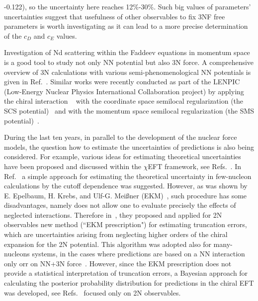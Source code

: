 -0.122), so the uncertainty here reaches 12\%-30\%. Such big values of parameters' uncertainties suggest that usefulness of other observables to fix 3NF free parameters is worth investigating as it can lead to a more precise determination of the $c_{D}$ and $c_{E}$ values. 

Investigation of Nd scattering within the Faddeev equations in momentum space is a good tool to study not only NN potential but also 3N force. A comprehensive overview of 3N calculations with various semi-phenomenological NN potentials is given in Ref.~\cite{Witaa2001}. Similar works were recently conducted as part of the LENPIC (Low-Energy Nuclear Physics International Collaboration project) by applying the chiral interaction ~\cite{binder2016few, binder2018few, epelbaum2019few} with the coordinate space semilocal regularization (the SCS potential)~\cite{Epelbaum2015} and with the momentum space semilocal regularization (the SMS potential)~\cite{Reinert2018, epelbaum2020towards}. 

During the last ten years, in parallel to the development of the nuclear force models, the question how to estimate the uncertainties of predictions is also being considered. For example, various ideas for estimating theoretical uncertainties have been proposed and discussed within the $\chi$EFT framework, see Refs.~\cite{melendez2017bayesian, Epelbaum2015, Furnstahl2015, ekstrom2013optimized, perez2015low}. In Ref.~\cite{Epelbaum2009} a simple approach for estimating the theoretical uncertainty in few-nucleon calculations by the cutoff dependence was suggested. However, as was shown by E. Epelbaum, H. Krebs, and Ulf-G. Mei{\ss}ner (EKM)~\cite{Epelbaum2015}, such procedure has some disadvantages, namely does not allow one to evaluate precisely the effects of neglected interactions. Therefore in~\cite{Epelbaum2015}, they proposed and applied for 2N observables new method (``EKM prescription") for estimating truncation errors, which are uncertainties arising from neglecting higher orders of the chiral expansion for the 2N potential. This algorithm was adopted also for many-nucleons systems, in the cases where predictions are based on a NN interaction~\cite{binder2016few,binder2018few} only orr on NN+3N force~\cite{epelbaum2019few}. However, since the EKM prescription does not provide a statistical interpretation of truncation errors, a Bayesian approach for calculating the posterior probability distribution for predictions in the chiral EFT was developed, see Refs.~\cite{melendez2017bayesian, Furnstahl2015} focused only on 2N observables. 

